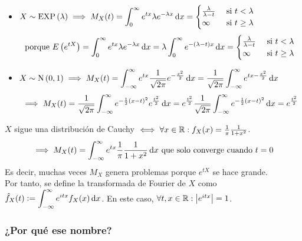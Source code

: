 \begin{ejem}
	\begin{itemize}
		\item $\ds X\sim \EXP{\lambda} \implies M_X(t) = \int_{0}^{\infty} e^{tx}\lambda e^{-\lambda x}\odif{x} = \begin{cases}
				      \frac{\lambda}{\lambda - t} & \tex{ si } t < \lambda    \\
				      \infty                      & \tex{ si } t \geq \lambda
			      \end{cases}$
		      \[\tex{porque } E\left(e^{tX}\right) = \int_{0}^{\infty} e^{tx}\lambda e^{-\lambda x}\odif{x} = \lambda \int_{0}^{\infty} e^{-(\lambda - t)x}\odif{x} = \begin{cases}
				      \frac{\lambda}{\lambda - t} & \tex{ si } t < \lambda    \\
				      \infty                      & \tex{ si } t \geq \lambda
			      \end{cases}\]
		\item $\ds X\sim \normal{0,1} \implies M_X(t) = \int_{-\infty}^{\infty} e^{tx}\frac{1}{\sqrt{2\pi}}e^{-\frac{x^2}{2}}\odif{x} = \frac{1}{\sqrt{2\pi}}\int_{-\infty}^{\infty} e^{tx-\frac{x^2}{2}}\odif{x}$
		      \[\implies M_X(t) = \frac{1}{\sqrt{2\pi}} \int_{-\infty}^{\infty} e^{-\frac{1}{2}\left(x-t\right)^2} e^{\frac{t^2}{2}}\odif{x} = e^{\frac{t^2}{2}} \frac{1}{\sqrt{2\pi}} \int_{-\infty}^{\infty} e^{-\frac{1}{2}\left(x-t\right)^2}\odif{x} = e^{\frac{t^2}{2}}\]
	\end{itemize}
\end{ejem}


\begin{ejem}
	$X$ sigue una distribución de Cauchy $\iff \forall x \in \mathbb{R} : f_X(x) = \frac{1}{\pi} \frac{1}{1+x^2}$.
	\[\implies M_X(t) = \int_{-\infty}^{\infty} e^{tx} \frac{1}{\pi} \frac{1}{1+x^2}\odif{x} \tex{ que solo converge cuando }t=0\]
	Es decir, muchas veces $M_X$ genera problemas porque $e^{tX}$ se hace grande. \\
	Por tanto, se define la transformada de Fourier de $X$ como $\ds \hat{f}_X(t) \defeq \int_{-\infty}^{\infty} e^{itx}f_X(x)\odif{x}$. En este caso, $\forall t, x \in \mathbb{R} : \left|e^{itx}\right| = 1$.
\end{ejem}

\subsubsection{¿Por qué ese nombre?}

